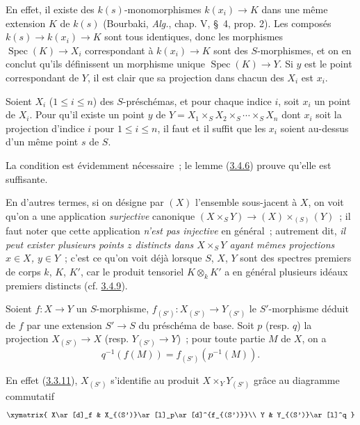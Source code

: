 En effet, il existe des $k(s)$-monomorphismes $k(x_i)\to K$ dans une même
extension $K$ de $k(s)$ (Bourbaki, \emph{Alg.}, chap. V, \S~4, prop. 2). Les
composés $k(s)\to k(x_i)\to K$ sont tous identiques, donc les morphismes
$\operatorname{Spec}(K)\to X_i$ correspondant à $k(x_i)\to K$ sont des
$S$-morphismes, et on en conclut qu'ils définissent un morphisme unique
$\operatorname{Spec}(K)\to Y$. Si $y$ est le point correspondant de $Y$, il
est clair que sa projection dans chacun des $X_i$ est $x_i$.

\begin{proposition}[3.4.7]
\label{I.3.4.7-fr}
Soient $X_i$ ($1\leq i\leq n$) des $S$-préschémas, et pour chaque indice $i$,
soit $x_i$ un point de $X_i$. Pour qu'il existe un point $y$ de
$Y=X_1\times_S X_2\times_S\cdots\times_S X_n$ dont $x_i$ soit la projection
d'indice $i$ pour $1\leq i\leq n$, il faut et il suffit que les $x_i$ soient
au-dessus d'un même point $s$ de $S$.
\end{proposition}

La condition est évidemment nécessaire~; le lemme
(\hyperref[I.3.4.6-fr]{3.4.6}) prouve qu'elle est suffisante.

\label{I.3.4.7.underlying-map-fr}
En d'autres termes, si on désigne par $(X)$ l'ensemble sous-jacent à $X$, on
voit qu'on a une application \emph{surjective} canonique
$(X\times_S Y)\to (X)\times_{(S)}(Y)$~; il faut noter que cette application
\emph{n'est pas injective} en général~; autrement dit, \emph{il peut exister
plusieurs points $z$ distincts dans $X\times_S Y$ ayant mêmes projections
$x\in X$, $y\in Y$}~; c'est ce qu'on voit déjà lorsque $S$, $X$, $Y$ sont des
spectres premiers de corps $k$, $K$, $K'$, car le produit tensoriel
$K\otimes_k K'$ a en général plusieurs idéaux premiers distincts
(cf. \hyperref[I.3.4.9-fr]{3.4.9}).

\begin{corollary}[3.4.8]
\label{I.3.4.8-fr}
Soient $f:X\to Y$ un $S$-morphisme, $f_{(S')}:X_{(S')}\to Y_{(S')}$ le
$S'$-morphisme déduit de $f$ par une extension $S'\to S$ du préschéma de base.
Soit $p$ (resp. $q$) la projection $X_{(S')}\to X$ (resp.
$Y_{(S')}\to Y$)~; pour toute partie $M$ de $X$, on a
\label{I.3.4.8.base-change-image-fr}
\[
  q^{-1}(f(M))=f_{(S')}(p^{-1}(M)).
\]
\end{corollary}

En effet (\hyperref[I.3.3.11-fr]{3.3.11}), $X_{(S')}$ s'identifie au produit
$X\times_Y Y_{(S')}$ grâce au diagramme commutatif
\label{I.3.4.8.proof-diagram-fr}
\[
  \xymatrix{
    X\ar[d]_f & X_{(S')}\ar[l]_p\ar[d]^{f_{(S')}}\\
    Y & Y_{(S')}\ar[l]^q
  }
\]

